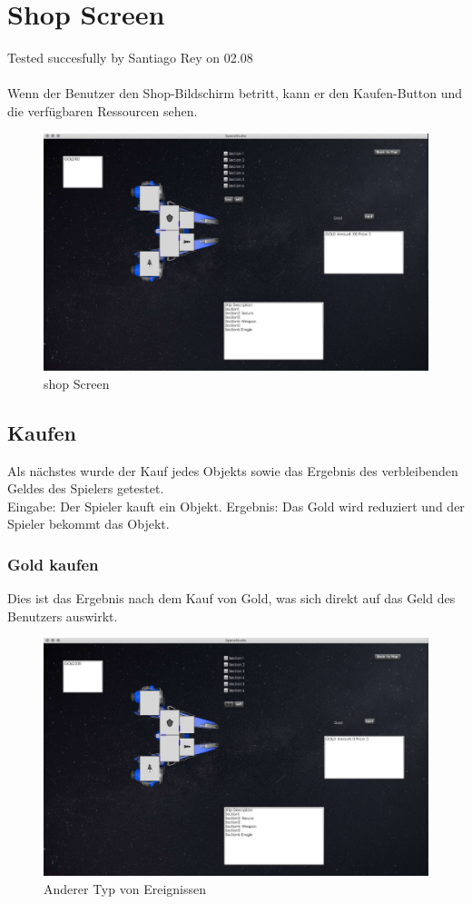 \documentclass[12pt]{article}
\begin{document}
\section{Shop Screen}
Tested succesfully by Santiago Rey on 02.08\\\\
Wenn der Benutzer den Shop-Bildschirm betritt, kann er den Kaufen-Button und die verfügbaren Ressourcen sehen.
\begin{figure}[h]
\centering
\includegraphics[scale=0.4]{TestProtocolBilder/shopScreen.jpg}
\caption{shop Screen}
\end{figure}

\subsection{Kaufen}
Als nächstes wurde der Kauf jedes Objekts sowie das Ergebnis des verbleibenden Geldes des Spielers getestet.\\
Eingabe: Der Spieler kauft ein Objekt.
Ergebnis: Das Gold wird reduziert und der Spieler bekommt das Objekt.
\subsubsection{Gold kaufen}
Dies ist das Ergebnis nach dem Kauf von Gold, was sich direkt auf das Geld des Benutzers auswirkt.
\begin{figure}[htp]
\centering
\includegraphics[scale=0.4]{TestProtocolBilder/goldgekauft.jpg}
\caption{Anderer Typ von Ereignissen}
\end{figure}
\newpage
\end{document}
